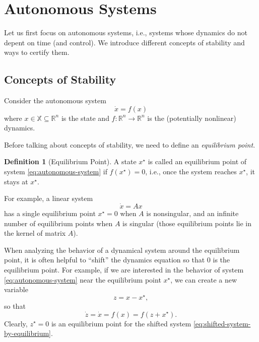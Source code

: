 \documentclass[
]{book}
\theoremstyle{definition}
\newtheorem{definition}{Definition}[chapter]
\theoremstyle{definition}
\theoremstyle{definition}
\theoremstyle{definition}
\theoremstyle{remark}
\begin{document}
\hypertarget{autonomous-systems}{%
\section{Autonomous Systems}\label{autonomous-systems}}

Let us first focus on autonomous systems, i.e., systems whose dynamics do not depent on time (and control). We introduce different concepts of stability and ways to certify them.

\hypertarget{concepts-of-stability}{%
\subsection{Concepts of Stability}\label{concepts-of-stability}}

Consider the autonomous system
\begin{equation}
\dot{x} = f(x)
\label{eq:autonomous-system}
\end{equation}
where \(x \in \mathbb{X} \subseteq \mathbb{R}^n\) is the state and \(f: \mathbb{R}^n \rightarrow \mathbb{R}^n\) is the (potentially nonlinear) dynamics.

Before talking about concepts of stability, we need to define an \emph{equilibrium point}.

\begin{definition}[Equilibrium Point]
\protect\hypertarget{def:equilibriumpoint}{}\label{def:equilibriumpoint}A state \(x^\star\) is called an equilibrium point of system \eqref{eq:autonomous-system} if \(f(x^\star) = 0\), i.e., once the system reaches \(x^\star\), it stays at \(x^\star\).
\end{definition}

For example, a linear system
\[
\dot{x} = A x
\]
has a single equilibrium point \(x^\star = 0\) when \(A\) is nonsingular, and an infinite number of equilibrium points when \(A\) is singular (those equilibrium points lie in the kernel of matrix \(A\)).

When analyzing the behavior of a dynamical system around the equilibrium point, it is often helpful to ``shift'' the dynamics equation so that \(0\) is the equilibrium point. For example, if we are interested in the behavior of system \eqref{eq:autonomous-system} near the equilibrium point \(x^\star\), we can create a new variable
\[
z = x - x^\star,
\]
so that
\begin{equation}
\dot{z} = \dot{x} = f(x) = f(z + x^\star).
\label{eq:shifted-system-by-equilibrium}
\end{equation}
Clearly, \(z^\star = 0\) is an equilibrium point for the shifted system \eqref{eq:shifted-system-by-equilibrium}.
\end{document}
